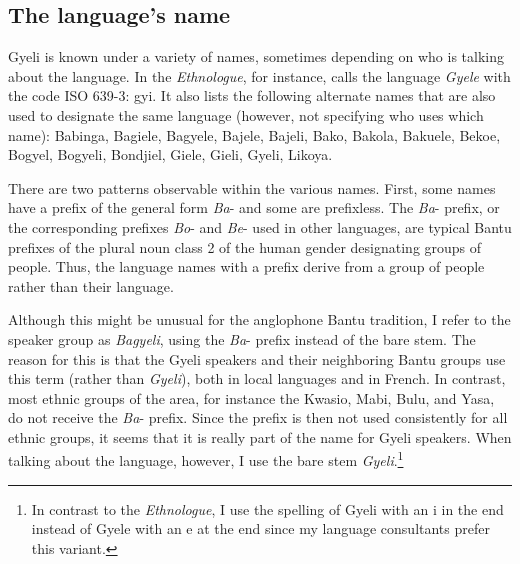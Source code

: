 \subsection{The language's name}
\label{sec:name}

Gyeli is known under a variety of names, sometimes depending on who is talking about the language. In the \textit{Ethnologue}, for instance, \citet{lewis09} calls the language \textit{Gyele} with the code ISO 639-3: gyi. It also lists the following alternate names that are also used to designate the same language (however, not specifying who uses which name): Babinga, Bagiele, Bagyele, Bajele, Bajeli, Bako, Bakola, Bakuele, Bekoe, Bogyel, Bogyeli, Bondjiel, Giele, Gieli, Gyeli, Likoya.

There are two patterns observable within the various names. First, some names have a prefix of the general form \textit{Ba}- and some are prefixless.
The \textit{Ba}- prefix, or the corresponding prefixes \textit{Bo}- and \textit{Be}- used in other languages, are typical Bantu prefixes of the plural noun class 2 of the human gender designating groups of people. Thus, the language names with a prefix derive from a group of people rather than their language. 

Although this might be unusual for the anglophone Bantu tradition, I refer to the speaker group as {\itshape Bagyeli}, using the {\itshape Ba}- prefix instead of the bare stem. The reason for this is that the Gyeli speakers and their neighboring Bantu groups use this term (rather than {\itshape Gyeli}), both in local languages and in French. In contrast, most ethnic groups of the area, for instance the Kwasio, Mabi, Bulu, and Yasa, do not receive  the {\itshape Ba}- prefix. Since the prefix is then not used consistently for all ethnic groups, it seems that it is really part of the name for Gyeli speakers. When talking about the language, however, I use the bare stem {\itshape Gyeli}.\footnote{In contrast to the \textit{Ethnologue}, I use the spelling of Gyeli with an {\textlangle}i{\textrangle} in the end instead of Gyele with an {\textlangle}e{\textrangle} at the end since my language consultants prefer this variant.}

